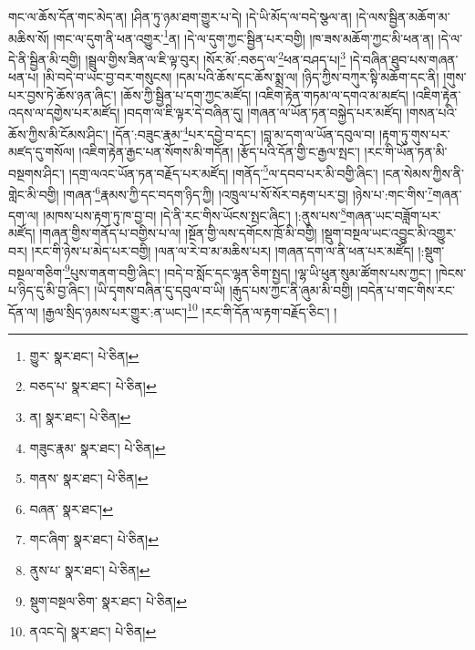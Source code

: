 གང་ལ་ཆོས་དོན་གང་མེད་ན། །ཤིན་ཏུ་ཉམ་ཐག་གྱུར་པ་དེ། །དེ་ཡི་མོད་ལ་བདེ་སྩལ་ན། །དེ་ལས་སྦྱིན་མཆོག་མ་མཆིས་སོ། །གང་ལ་དུག་ནི་ཕན་འགྱུར་\footnote{གྱུར་  སྣར་ཐང་།  པེ་ཅིན། }ན། །དེ་ལ་དུག་ཀྱང་སྦྱིན་པར་བགྱི། །ཁ་ཟས་མཆོག་ཀྱང་མི་ཕན་ན། །དེ་ལ་དེ་ནི་སྦྱིན་མི་བགྱི། །སྦྲུལ་གྱིས་ཟིན་ལ་ཇི་ལྟ་བུར། །སོར་མོ་:བཅད་ལ་\footnote{བཅད་པ་  སྣར་ཐང་།  པེ་ཅིན། }ཕན་བཤད་པ།\footnote{ན།  སྣར་ཐང་།  པེ་ཅིན། } །དེ་བཞིན་ཐུབ་པས་གཞན་ཕན་པ། །མི་བདེ་བ་ཡང་བྱ་བར་གསུངས། །དམ་པའི་ཆོས་དང་ཆོས་སྨྲ་ལ། །ཉིད་ཀྱིས་བཀུར་སྟི་མཆོག་དང་ནི། །གུས་པར་བྱས་ཏེ་ཆོས་ཉན་ཞིང་། །ཆོས་ཀྱི་སྦྱིན་པ་དག་ཀྱང་མཛོད། །འཇིག་རྟེན་གཏམ་ལ་དགའ་མ་མཛད། །འཇིག་རྟེན་འདས་ལ་དགྱེས་པར་མཛོད། །བདག་ལ་ཇི་ལྟར་དེ་བཞིན་དུ། །གཞན་ལ་ཡོན་ཏན་བསྐྱེད་པར་མཛོད། །གསན་པའི་ཆོས་ཀྱིས་མི་ངོམས་ཤིང་། །དོན་:བཟུང་རྣམ་\footnote{གཟུང་རྣམ་  སྣར་ཐང་།  པེ་ཅིན། }པར་དབྱེ་བ་དང་། །བླ་མ་དག་ལ་ཡོན་དབུལ་བ། །རྟག་ཏུ་གུས་པར་མཛད་དུ་གསོལ། །འཇིག་རྟེན་རྒྱང་པན་སོགས་མི་གདོན། །རྩོད་པའི་དོན་གྱི་ང་རྒྱལ་སྤང་། །རང་གི་ཡོན་ཏན་མི་བསྔགས་ཤིང་། །དགྲ་ལའང་ཡོན་ཏན་བརྗོད་པར་མཛོད། །གནོད་\footnote{གནས་  སྣར་ཐང་།  པེ་ཅིན། }ལ་དབབ་པར་མི་བགྱི་ཞིང་། །ངན་སེམས་ཀྱིས་ནི་གླེང་མི་བགྱི། །གཞན་\footnote{བཞན་  སྣར་ཐང་། }རྣམས་ཀྱི་དང་བདག་ཉིད་ཀྱི། །འཁྲུལ་པ་སོ་སོར་བརྟག་པར་བྱ། །ཉེས་པ་:གང་གིས་\footnote{གང་ཞིག་  སྣར་ཐང་།  པེ་ཅིན། }གཞན་དག་ལ། །མཁས་པས་རྟག་ཏུ་ཁ་བྱ་བ། །དེ་ནི་རང་གིས་ཡོངས་སྤང་ཞིང་། །:ནུས་པས་\footnote{ནུས་པ་  སྣར་ཐང་།  པེ་ཅིན། }གཞན་ཡང་བཟློག་པར་མཛོད། །གཞན་གྱིས་གནོད་པ་བགྱིས་པ་ལ། །སྔོན་གྱི་ལས་དགོངས་ཁྲོ་མི་བགྱི། །སྡུག་བསྔལ་ཡང་འབྱུང་མི་འགྱུར་བར། །རང་གི་ཉེས་པ་མེད་པར་བགྱི། །ལན་ལ་རེ་བ་མ་མཆིས་པར། །གཞན་དག་ལ་ནི་ཕན་པར་མཛོད། །:སྡུག་བསྔལ་གཅིག་\footnote{སྡུག་བསྔལ་ཅིག་  སྣར་ཐང་།  པེ་ཅིན། }པུས་གནག་བགྱི་ཞིང་། །བདེ་བ་སློང་དང་ལྷན་ཅིག་སྤྱད། །ལྷ་ཡི་ཕུན་སུམ་ཚོགས་པས་ཀྱང་། །ཁེངས་པ་ཉིད་དུ་མི་བྱ་ཞིང་། །ཡི་དྭགས་བཞིན་དུ་དབུལ་བ་ཡི། །རྒུད་པས་ཀྱང་ནི་ཞུམ་མི་བགྱི། །བདེན་པ་གང་གིས་རང་དོན་ལ། །རྒྱལ་སྲིད་ཉམས་པར་གྱུར་:ན་ཡང་།\footnote{ནའང་དེ།  སྣར་ཐང་།  པེ་ཅིན། } །རང་གི་དོན་ལ་རྟག་བརྗོད་ཅིང་། །
